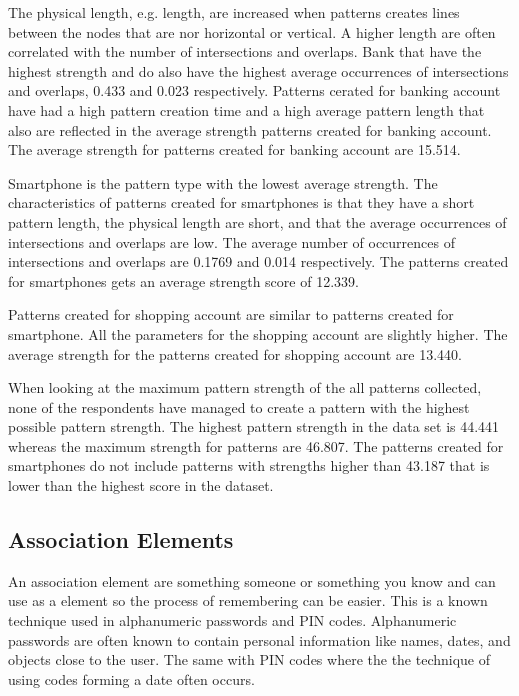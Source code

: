     The physical length, e.g. length, are increased when patterns creates lines between the nodes that are nor horizontal or vertical. A higher length are often correlated with the number of intersections and overlaps. Bank that have the highest strength and do also have the highest average occurrences of intersections and overlaps, 0.433 and 0.023 respectively. Patterns cerated for banking account have had a high pattern creation time and a high average pattern length that also are reflected in the average strength patterns created for banking account. The average strength for patterns created for banking account are 15.514.

    Smartphone is the pattern type with the lowest average strength. The characteristics of patterns created for smartphones is that they have a short pattern length, the physical length are short, and that the average occurrences of intersections and overlaps are low. The average number of occurrences of intersections and overlaps are 0.1769 and 0.014 respectively. The patterns created for smartphones gets an average strength score of 12.339. 

    Patterns created for shopping account are similar to patterns created for smartphone. All the parameters for the shopping account are slightly higher. The average strength for the patterns created for shopping account are 13.440.

    When looking at the maximum pattern strength of the all patterns collected, none of the respondents have managed to create a pattern with the highest possible pattern strength. The highest pattern strength in the data set is 44.441 whereas the maximum strength for patterns are 46.807. The patterns created for smartphones do not include patterns with strengths higher than 43.187 that is lower than the highest score in the dataset. 

  \subsection{Association Elements} \label{sec:associationelements}
    An association element are something someone or something you know and can use as a element so the process of remembering can be easier. This is a known technique used in alphanumeric passwords and PIN codes. Alphanumeric passwords are often known to contain personal information like names, dates, and objects close to the user. The same with PIN codes where the the technique of using codes forming a date often occurs. 

